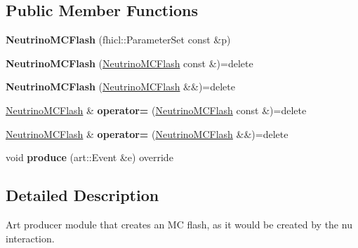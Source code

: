 \subsection*{Public Member Functions}
\begin{DoxyCompactItemize}
\item 
\hypertarget{classNeutrinoMCFlash_a924c91e62abb544113c57f337b792da0}{{\bfseries Neutrino\-M\-C\-Flash} (fhicl\-::\-Parameter\-Set const \&p)}\label{classNeutrinoMCFlash_a924c91e62abb544113c57f337b792da0}

\item 
\hypertarget{classNeutrinoMCFlash_a1c2730ddb25b20ea1888ecab79b5d08b}{{\bfseries Neutrino\-M\-C\-Flash} (\hyperlink{classNeutrinoMCFlash}{Neutrino\-M\-C\-Flash} const \&)=delete}\label{classNeutrinoMCFlash_a1c2730ddb25b20ea1888ecab79b5d08b}

\item 
\hypertarget{classNeutrinoMCFlash_aaa3156265c398dcf28e2f89221010ba4}{{\bfseries Neutrino\-M\-C\-Flash} (\hyperlink{classNeutrinoMCFlash}{Neutrino\-M\-C\-Flash} \&\&)=delete}\label{classNeutrinoMCFlash_aaa3156265c398dcf28e2f89221010ba4}

\item 
\hypertarget{classNeutrinoMCFlash_a4473e1b794f33fde6aea4c741a5ebeda}{\hyperlink{classNeutrinoMCFlash}{Neutrino\-M\-C\-Flash} \& {\bfseries operator=} (\hyperlink{classNeutrinoMCFlash}{Neutrino\-M\-C\-Flash} const \&)=delete}\label{classNeutrinoMCFlash_a4473e1b794f33fde6aea4c741a5ebeda}

\item 
\hypertarget{classNeutrinoMCFlash_a13f1fc3b336ec7c9bd96983ec51b3e22}{\hyperlink{classNeutrinoMCFlash}{Neutrino\-M\-C\-Flash} \& {\bfseries operator=} (\hyperlink{classNeutrinoMCFlash}{Neutrino\-M\-C\-Flash} \&\&)=delete}\label{classNeutrinoMCFlash_a13f1fc3b336ec7c9bd96983ec51b3e22}

\item 
\hypertarget{classNeutrinoMCFlash_a96fff468ffb1b1182b296d9bdab6d31b}{void {\bfseries produce} (art\-::\-Event \&e) override}\label{classNeutrinoMCFlash_a96fff468ffb1b1182b296d9bdab6d31b}

\end{DoxyCompactItemize}


\subsection{Detailed Description}
Art producer module that creates an M\-C flash, as it would be created by the nu interaction. 

